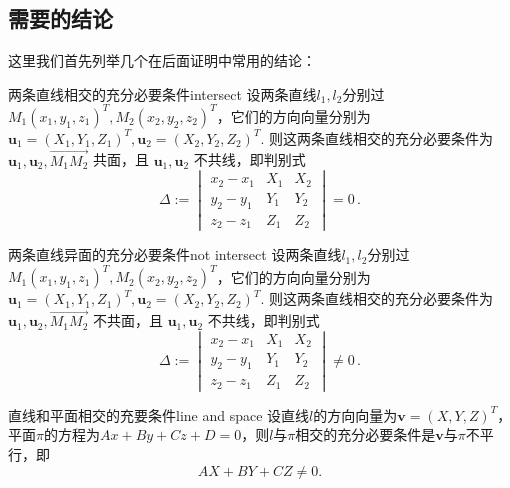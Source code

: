 \documentclass[12pt, a4paper,newtx]{ctexart}
\begin{document}
\subsection{需要的结论}
这里我们首先列举几个在后面证明中常用的结论：\begin{conclusion}{两条直线相交的充分必要条件}{intersect}
	设两条直线$l_1,l_2$分别过$M_1\left(x_1,y_1,z_1\right)^T,M_2\left(x_2,y_2,z_2\right)^T$，它们的方向向量分别为$\bm u_1=\left(X_1,Y_1,Z_1\right)^T,\bm u_2=\left(X_2,Y_2,Z_2\right)^T$. 则这两条直线相交的充分必要条件为 $\bm{u}_1, \bm{u}_2, \overrightarrow{M_1M_2}$ 共面，且 $\bm{u}_1, \bm{u}_2$ 不共线，即判别式
	\[
	\Delta := \begin{vmatrix}
		x_2 - x_1 & X_1 & X_2 \\
		y_2 - y_1 & Y_1 & Y_2 \\
		z_2 - z_1 & Z_1 & Z_2
	\end{vmatrix} = 0 \, .\]
\end{conclusion}
\begin{conclusion}{两条直线异面的充分必要条件}{not intersect}
	设两条直线$l_1,l_2$分别过$M_1\left(x_1,y_1,z_1\right)^T,M_2\left(x_2,y_2,z_2\right)^T$，它们的方向向量分别为$\bm u_1=\left(X_1,Y_1,Z_1\right)^T,\bm u_2=\left(X_2,Y_2,Z_2\right)^T$. 则这两条直线相交的充分必要条件为 $\bm{u}_1, \bm{u}_2, \overrightarrow{M_1M_2}$ 不共面，且 $\bm{u}_1, \bm{u}_2$ 不共线，即判别式
	\[
	\Delta := \begin{vmatrix}
		x_2 - x_1 & X_1 & X_2 \\
		y_2 - y_1 & Y_1 & Y_2 \\
		z_2 - z_1 & Z_1 & Z_2
	\end{vmatrix} \ne 0 \, .\]
\end{conclusion}
\begin{conclusion}{直线和平面相交的充要条件}{line and space}
	设直线$l$的方向向量为$\bm v=(X,Y,Z)^T$，平面$\pi$的方程为$Ax+By+Cz+D=0$，则$l$与$\pi$相交的充分必要条件是$\bm v$与$\pi$不平行，即\[AX+BY+CZ\ne0.\]
\end{conclusion}
\end{document}
